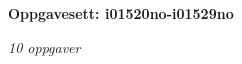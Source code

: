 \centerline{\bf Oppgavesett: i01520no-i01529no}
\vskip 10pt
\centerline{\it 10 oppgaver}\vskip 10pt
\vskip 10pt
